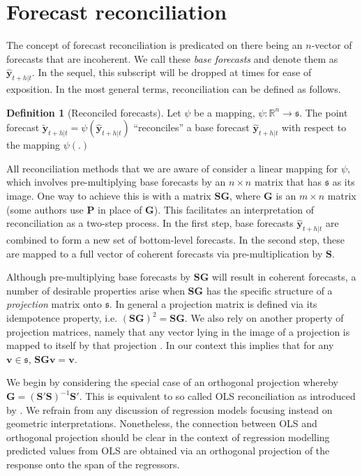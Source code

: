\documentclass[12pt]{article}
\theoremstyle{definition}
\newtheorem{definition}{Definition}[section]
\begin{document}
\section{Forecast reconciliation}\label{sec:Reconciliation}

The concept of forecast reconciliation is predicated on there being an $n$-vector of forecasts that are incoherent. We call these \emph{base forecasts} and denote them as $\hat{\bm{y}}_{t+h|t}$. In the sequel, this subscript will be dropped at times for ease of exposition. In the most general terms, reconciliation can be defined as follows.

\begin{definition}[Reconciled forecasts]\label{def:reconpoint}
  Let $\psi$ be a mapping, $\psi:\mathbb{R}^n\rightarrow\mathfrak{s}$. The point forecast $\tilde{\bm{y}}_{t+h|t}=\psi(\hat{\bm{y}}_{t+h|t})$ ``reconciles'' a base forecast $\hat{\bm{y}}_{t+h|t}$ with respect to the mapping $\psi(.)$
\end{definition}

All reconciliation methods that we are aware of consider a linear mapping for $\psi$, which involves pre-multiplying base forecasts by an $n\times n$ matrix that has $\mathfrak{s}$ as its image. One way to achieve this is with a matrix $\bm{S}\bm{G}$, where $\bm{G}$ is an $m\times n$ matrix (some authors use $\bm{P}$ in place of $\bm{G}$). This facilitates an interpretation of reconciliation as a two-step process. In the first step, base forecasts $\hat{\bm{y}}_{t+h|t}$ are combined to form a new set of bottom-level forecasts. In the second step, these are mapped to a full vector of coherent forecasts via pre-multiplication by $\bm{S}$.

Although pre-multiplying base forecasts by $\bm{S}\bm{G}$ will result in coherent forecasts, a number of desirable properties arise when $\bm{S}\bm{G}$ has the specific structure of a \emph{projection} matrix onto $\mathfrak{s}$. In general a projection matrix is defined via its idempotence property, i.e. $(\bm{S}\bm{G})^2=\bm{S}\bm{G}$. We also rely on another property of projection matrices, namely that any vector lying in the image of a projection is mapped to itself by that projection \citep[see Lemma 2.4 in][for a proof]{rao1974}. In our context this implies that for any $\bm{v}\in\mathfrak{s}$, $\bm{S}\bm{G}\bm{v}=\bm{v}$.

We begin by considering the special case of an orthogonal projection whereby $\bm{G}=(\bm{S}'\bm{S})^{-1}\bm{S}'$. This is equivalent to so called OLS reconciliation as introduced by \citet{Hyndman2011}. We refrain from any discussion of regression models focusing instead on geometric interpretations. {\color{blue} Nonetheless,} the connection between OLS and orthogonal projection should be clear in the context of regression modelling predicted values from OLS are obtained via an orthogonal projection of the response onto the span of the regressors.
\end{document}
